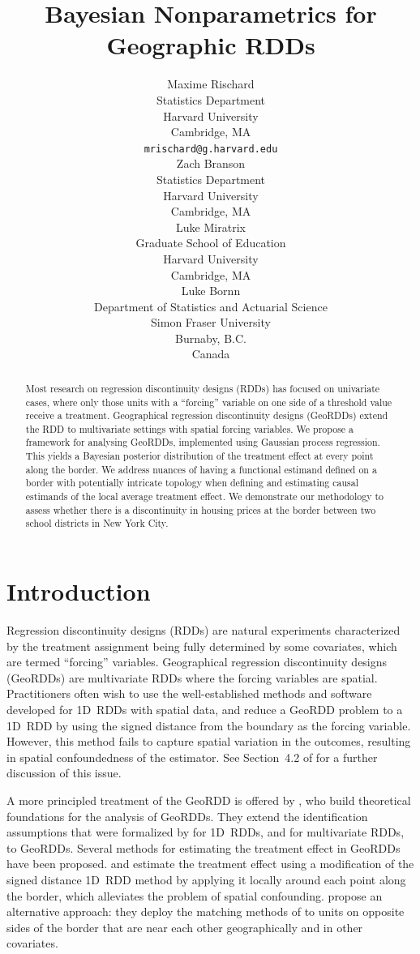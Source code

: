 \documentclass{article}
\title{Bayesian Nonparametrics for Geographic RDDs}
\author{
  Maxime Rischard \\
  Statistics Department \\
  Harvard University \\
  Cambridge, MA \\
  \texttt{mrischard@g.harvard.edu} \\
  \And
  Zach Branson \\
  Statistics Department \\
  Harvard University \\
  Cambridge, MA \\
  \And
  Luke Miratrix \\
  Graduate School of Education \\
  Harvard University \\
  Cambridge, MA \\
  \And
  Luke Bornn \\
  Department of Statistics and Actuarial Science\\
  Simon Fraser University\\
  Burnaby, B.C.\\
  Canada
}
\begin{document}


\maketitle

\begin{abstract}
    Most research on regression discontinuity designs (RDDs) has focused on univariate cases, where only those units with a ``forcing'' variable on one side of a threshold value receive a treatment.
    Geographical regression discontinuity designs (GeoRDDs) extend the RDD to multivariate settings with spatial forcing variables.
    We propose a framework for analysing GeoRDDs, implemented using Gaussian process regression. 
    This yields a Bayesian posterior distribution of the treatment effect at every point along the border.
    We address nuances of having a functional estimand defined on a border with potentially intricate topology when defining and estimating causal estimands of the local average treatment effect.
    We demonstrate our methodology to assess whether there is a discontinuity in housing prices at the border between two school districts in New York City.
\end{abstract}

\section{Introduction}\label{introduction}

Regression discontinuity designs (RDDs) are natural experiments characterized by the treatment assignment being fully determined by some covariates, which are termed ``forcing'' variables.
Geographical regression discontinuity designs (GeoRDDs) are multivariate RDDs where the forcing variables are spatial.
Practitioners often wish to use the well-established methods and software developed for 1D~RDDs with spatial data,
and reduce a GeoRDD problem to a 1D~RDD by using the signed distance from the boundary as the forcing variable.
However, this method fails to capture spatial variation in the outcomes, resulting in spatial confoundedness of the estimator.
See Section~4.2 of \cite{keele_titiunik_2015} for a further discussion of this issue.

A more principled treatment of the GeoRDD is offered by \cite{keele_titiunik_2015}, who build theoretical foundations for the analysis of GeoRDDs.
They extend the identification assumptions that were formalized by \cite{hahn2001identification} for 1D~RDDs, and \cite{imbens2011regression} for multivariate RDDs, to GeoRDDs.
Several methods for estimating the treatment effect in GeoRDDs have been proposed.
\cite{keele_titiunik_2015} and \cite{keeleoverview} estimate the treatment effect using a modification of the signed distance 1D~RDD method by applying it locally around each point along the border, which alleviates the problem of spatial confounding.
\cite{keele2015enhancing} propose an alternative approach: they deploy the matching methods of \cite{zubizarreta2012using} to units on opposite sides of the border that are near each other geographically and in other covariates.
\end{document}
